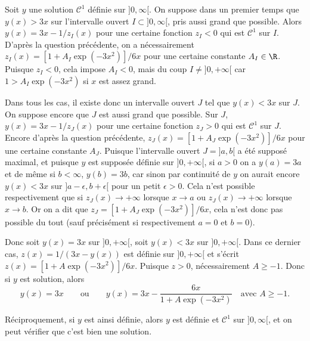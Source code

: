 {\begin{enumerate}
{    Soit $y$ une solution $\mathcal{C}^1$ définie sur $]0,\infty[$. On suppose dans un premier temps que $y(x) > 3x$ sur l'intervalle ouvert $I \subset ]0,\infty[$, pris aussi grand que possible.  Alors $y(x) = 3x - 1/{z_I(x)}$ pour une certaine fonction $z_I < 0$ qui est $\mathcal{C}^1$ sur $I$. D'après la question précédente, on a nécessairement $z_I(x) = [1+A_I\exp(-3x^2)]/6x$ pour une certaine constante $A_I \in \R$. Puisque $z_I < 0$, cela impose $A_I<0$, mais du coup $I \neq ]0,+\infty[$ car $1 > A_I\exp(-3x^2)$ si $x$ est assez grand.
  
  Dans tous les cas, il existe donc un intervalle ouvert $J$ tel que $y(x) < 3x$ sur $J$. On suppose encore que $J$ est aussi grand que possible. Sur $J$, $y(x) = 3x - 1/{z_J(x)}$ pour une certaine fonction $z_J > 0$ qui est $\mathcal{C}^1$ sur $J$. Encore d'après la question précédente, $z_J(x) = [1+A_J\exp(-3x^2)]/6x$ pour une certaine constante $A_J$.
 Puisque l'intervalle ouvert $J = ]a,b[$ a été supposé maximal, et puisque $y$ est supposée définie sur $]0,+\infty[$, si $a > 0$ on a $y(a) = 3a$ et de même si $b < \infty$, $y(b) = 3b$, car sinon par continuité de $y$ on aurait encore $y(x) < 3x$ sur $]a-\epsilon,b+\epsilon[$ pour un petit $\epsilon > 0$. Cela n'est possible respectivement que si $z_J(x) \rightarrow +\infty$ lorsque $x \rightarrow a$ ou $z_J(x) \rightarrow +\infty$ lorsque $x \rightarrow b$. Or on a dit que $z_J = [1+A_J\exp(-3x^2)]/6x$, cela n'est donc pas possible du tout (sauf précisément si respectivement $a =0$ et $b=0$).
  
  Donc soit $y(x) = 3x$ sur $]0,+\infty[$, soit $y(x) < 3x$ sur $]0,+\infty[$. Dans ce dernier cas, $z(x) = 1/(3x-y(x))$ est définie sur $]0,+\infty[$ et s'écrit $z(x) = [1+A\exp(-3x^2)]/6x$. Puisque $z > 0$, nécessairement $A \geq -1$. Donc si $y$ est solution, alors     
    \[ y(x) = 3x \qquad \text{ou} \qquad y(x) =  3x - \frac{6x}{1+A\exp(-3x^2)} \quad \text{avec } A \geq -1.\]
    
 Réciproquement, si $y$ est ainsi définie, alors $y$ est définie et $\mathcal{C}^1$ sur $]0,\infty[$, et on peut vérifier que c'est bien une solution.}
\end{enumerate}
}
